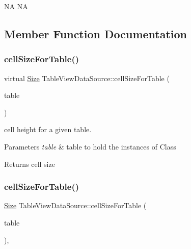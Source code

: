 NA  NA 

\subsection{Member Function Documentation}
\mbox{\label{classTableViewDataSource_aabfec607877c875c679f571c508bb4a0}} 
\subsubsection{\texorpdfstring{cell\+Size\+For\+Table()}{cellSizeForTable()}\hspace{0.1cm}{\footnotesize\ttfamily [1/2]}}
{\footnotesize\ttfamily virtual \hyperlink{classSize}{Size} Table\+View\+Data\+Source\+::cell\+Size\+For\+Table (\begin{DoxyParamCaption}\item[{\hyperlink{classTableView}{Table\+View} $\ast$}]{table }\end{DoxyParamCaption})\hspace{0.3cm}{\ttfamily [virtual]}}

cell height for a given table.


\begin{DoxyParams}{Parameters}
{\em table} & table to hold the instances of Class \\
\hline
\end{DoxyParams}
\begin{DoxyReturn}{Returns}
cell size 
\end{DoxyReturn}
\mbox{\label{classTableViewDataSource_af2a76d861999dc23861037aa67c8dc24}} 
\subsubsection{\texorpdfstring{cell\+Size\+For\+Table()}{cellSizeForTable()}\hspace{0.1cm}{\footnotesize\ttfamily [2/2]}}
{\footnotesize\ttfamily \hyperlink{classSize}{Size} Table\+View\+Data\+Source\+::cell\+Size\+For\+Table (\begin{DoxyParamCaption}\item[{\hyperlink{classTableView}{Table\+View} $\ast$}]{table }\end{DoxyParamCaption})\hspace{0.3cm}{\ttfamily [inline]}, {\ttfamily [virtual]}}

